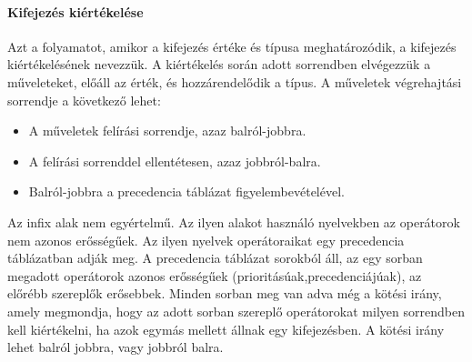\paragraph{Kifejezés kiértékelése} Azt a folyamatot, amikor a kifejezés értéke és típusa meghatározódik, a kifejezés kiértékelésének nevezzük. A kiértékelés során adott sorrendben elvégezzük a műveleteket, előáll az érték, és hozzárendelődik a típus. A műveletek végrehajtási sorrendje a következő lehet:
\begin{itemize}[noitemsep]
	\item A műveletek felírási sorrendje, azaz balról-jobbra.
	\item A felírási sorrenddel ellentétesen, azaz jobbról-balra.
	\item Balról-jobbra a precedencia táblázat figyelembevételével.
\end{itemize}
Az infix alak nem egyértelmű. Az ilyen alakot használó nyelvekben az operátorok nem azonos erősségűek. Az ilyen nyelvek operátoraikat egy precedencia táblázatban adják meg. A precedencia táblázat sorokból áll, az egy sorban megadott operátorok azonos erősségűek (prioritásúak,precedenciájúak), az előrébb szereplők erősebbek. Minden sorban meg van adva még a kötési irány,
amely megmondja, hogy az adott sorban szereplő operátorokat milyen sorrendben kell kiértékelni, ha azok egymás mellett állnak egy kifejezésben. A kötési irány lehet balról jobbra, vagy jobbról balra.

